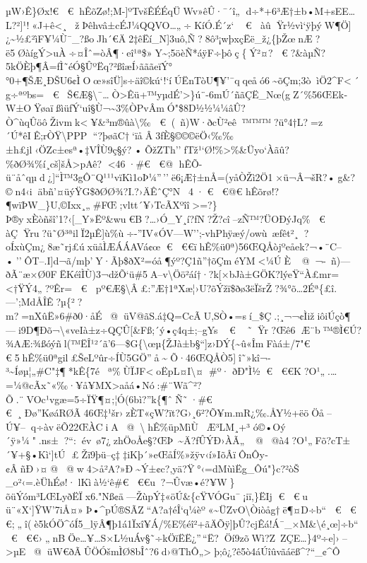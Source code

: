 µW›Ê\}Øx!€  € h\textbar ÊõZø!;M-{]}ºTvšÊÉÉqÜWv»êÛ·¯´î„
d÷*+6³Æ†±b•M+sEE\ldots L?²{]}¹!«J+ê\textless¸žÞêhvâ±cÉJ¼QQVO­\ldots„÷KíÓ.É´z`
€ 
àûŸr½vì`ÿþýW¶Ö{]}¿\textasciitilde½£²ìF¥¼Ù¯\_?ßoJh´€Ä2‡êËí\_N{]}3uô‚Ñ?8ô³¡wþxçËë\_ž¿\{þŽœnÆ?ë5Ø\textbar àígÝ\textgreater uÀ÷¤Îˆ=òÂ¶·eî¹ª\$»Y\textasciitilde;5öèÑ*áÿF÷þôç\{Ý²¤? 
€ ?\&àµÑ?5kÖÈþ¶Â=fÌ˜éÓ§ÛºËq?²ßîæÍ›ãããeïÝ°°0+¶ŠÆ¸ÐŠU6¢ÌOœ»sîÜ{]}s÷äî©kú`!{}`íÚËnTòU¶¥'¯qqeåó6\textasciitilde õÇm;3òìÖ2\^{}F\textless´g÷ªºbs=
€ Š€Æ§\textbackslash¯\ldotsÒ\textgreater Êü+™yµdÉ'\textgreater\}ú¨-6mÚ´ñãÇË\_\textquotesingle Nœ(gZ´\%56ŒEk­W±OŸøaïßìüfÝ`uî§Ù¬\textasciitilde3\%ÒPvÂmÓ"\$8D½½¼¼âÛ?Ò\^{}ùqÛöôŽivm\textquotesingle k\textless¥\&³m®ûà\textbackslash‰ 
€ (~ñ)W·ðcÙ²eê™™™?ü°4†L?=z´Ú*êIÊ;rÒŸ\textbackslash PPP
``?þøãC†`ïåÂ3fÈ§©©©ëÖ­‹‰‰±h£jl‹ÖZc±esª•‡VÎÙ9ç§ý?•ÕžZTh''fTž¹`Ø!\%\textgreater\%\&Üyo`Àãû?\%ðØ¾\%í¸cš{]}šÅ\textgreater pAê?
\textless46·\#€  €@
h\textbar ÊÕ-ü¨åˆqµd¿{]}``Ì™3gÔ¨Q¹¹¹vïKì1oÞ¼''\,''ë6¡Æ†±nÅ=(yåÒŽì­2Ö1×ü¬Â¬šR?•g\&?©n4‹iäbñ'¤üýŸG\$ðØ\textbar Ø¾?I.?›ÄÊˆÇ°N4·
€  €@€
h\textbar Êõrø!?¶wïÞW\_\}U‚©Ixx¸„\#FŒ;vltt´¥›TcÃXºîî\textgreater=?\}Þ®yxÈòñšî'1?‹{[}\_\textbar Y»Ëº\&wu€B?\ldots›Ó\_Y¸í?ƒN?Ž?cî--zÑ™?ÜOÐýJq\%
€ 
àÇŸru?ü˜Ø³ªilÏ2µÊ{]}ù\%ù÷-''IV«ÓV---W'';-vhPhÿæý/owù~æƒêt²¸?oÍxùÇm¿8æ˜rj£úxüåÌÆÁÁAVá¢œ
€ 
€€ïh\textbar Ê\%ü0ª)56ŒQÅòjºeåek?¬•¨C--•''ÔT--.I{]}d¬ã/mþ'Y·Ãþ\$ðX²=óå¶ýº?Ç1ñ''†õÇméYM\textless¼ÚÈ@ ¬-~ñ)---ðÃ¨æ×Ø0FËKéîÌÙ)3¬džÕ`ü\#5A--v\textbackslash Öö²áí†·?k{[}×bJà±\textbar GÖK?lýeŸ``À£mr=
\textless†ŸÝ4„?ºÊr= € 
pº€Æ§\textbackslash Â£:''Æ†1ªXæ¦›U?õÝžï\$ðø3ëÏšrŽ?¾°õ\ldots2Éª\{£î.---';MdÅÎÊ?µ\{²?m?=nXûË»6\#ð0·åÉ@ üV@ãS.á‡Q=CcÃU,SÒ•=sí\_\$Ç.;¸¬¬¢ÌižiôiÚçò¶---i9D¶Ðõ¬\textbackslash«veIà±z÷QÇÛ{[}\&Fß;´ý•ç4q±;--gYs
€  ˜Ÿr
?Œê6Æ¨b™®Ì€Ú?¾AÆ:¾ßóýñ\textquotesingle\textquotesingle l(™ËÎ¹²´ã'6---\$G\textquotesingle\{\textbackslash œµ\{ŽJà±b§``{]}z›\textquotesingle DÝ\{\textasciitilde û«ÎmFàá±/7"€ 
€ 5h\textbar Ê\%ü0ªgil£ŠeLºûr÷ÍÙ5GÖ''å\textasciitildeÕ·46ŒQÅÒ5{]}î˜»kî¬­³\textasciitilde Íøµ¦„\#C"‡¶*kÊ\{7éª\%ÙÏJF\textlessoËpL¤I\textbackslash¤\#º·
ðÐ"Ì½ € 
€€K?O¹„.\ldots=¼@cÃx˜«‰·¥å¥MX\textgreater aåá•Nó:\#¨Wã\^{}²?Õ­.¨VOc¹vgæ=5÷ÏŸ¶¤;¦Ó(6bì?''k\{¶ˆÑ˜·\#€ 
€ ¸Ðø''KøáRØÃ46Œ‡¹šr›zÈT«çW?ït?G›¸6²?Õ¥m.mR¿‰.ÅY½+ëöÖå--Ú¥--q÷àvëÕ22ŒÀCiA @ \textbackslash{}h\textbar Ê\%üpMìÙÆ³LM¸+³
ó©•Oý´ÿ\textquotesingle»¼".ns±?{}``:év~ø7¿zhÖoÅe§?ŒÞ~\textasciitilde Ä?ƒÛÝÐ›ÀÃ„\textquotesingle{}@ @à4?O¹„Fõ\textquotesingle?cT±´¥+§•Kì`{]}tÚ
£Žï9þü--ç‡‡iKþ´»eŒåÍ\%»žÿv‹í»IõÂïÔnÔy­¢ÂñÐ›¤@ @ w4\textgreater å²A?»Ð\textasciitilde Ý±¢c?,yä?Ÿ°‹=dMùìËg\_Ôú"\}c?²òŠ
\_o²‹=.èÜhÉø!·lKìà½`ê\#€ 
€€u?¬Ûvæ•\textbar é?¥W\}õüÝóm³LŒL\textbar yðËÏx6."Nß¢ä---ŽùpÝ‡«öÚ\&\{cŸVÓGu¯¡iï,\}ËIj
€  € u
ü¨«X`{]}ŸW'7iÅ¤»Þ•\^{}pÚ®SÃZ``A?a­†éÎ`q¼èº«\textasciitilde Ü\textbar ZvO\textbackslash Òiòåg†ë¶¤D÷b``
€ 
€€;„î(è5kÓÖ\^{}óÍ5\_lÿÂ¶þ1á1Ïxî¥Á/\%E\%éî²+ãÄÕÿ{]}þÛ?cjÊá!Á¯\_×M\&\textbackslash é¸œ{]}÷b``
€ 
€€›„nBÖe\ldots¥\ldots S×L½uÁ­v§˜÷kÖïËË¿''\,``Ë?Öí9zõWì?Z~ZÇE\ldots\}4º÷e{]}›--\textgreater µE @ üW€ðÃÛÖÓšmÌØ8bÎˆ?6d›@ThÔ„\textgreaterþ;ô¿?ê5ò4áÚîûvãáëß\^{}?{}``\_¢\^{}Ô


